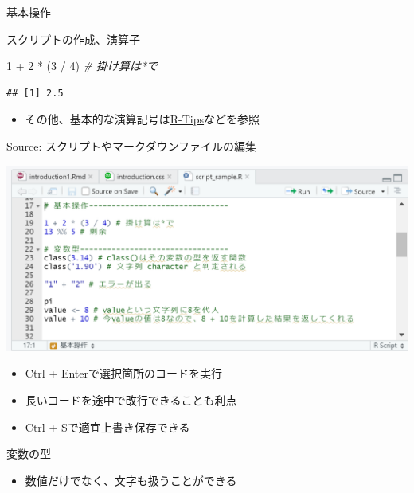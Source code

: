 \documentclass[
  ignorenonframetext,
]{beamer}
\newenvironment{Shaded}{\begin{snugshade}}{\end{snugshade}}
\newcommand{\CommentTok}[1]{\textcolor[rgb]{0.56,0.35,0.01}{\textit{#1}}}
\newcommand{\DecValTok}[1]{\textcolor[rgb]{0.00,0.00,0.81}{#1}}
\newcommand{\NormalTok}[1]{#1}
\newcommand{\SpecialCharTok}[1]{\textcolor[rgb]{0.00,0.00,0.00}{#1}}
\providecommand{\tightlist}{%
  \setlength{\itemsep}{0pt}\setlength{\parskip}{0pt}}
\begin{document}
\begin{frame}[fragile]{基本操作}
\begin{block}{スクリプトの作成、演算子}
\begin{Shaded}
\begin{Highlighting}[]
\DecValTok{1} \SpecialCharTok{+} \DecValTok{2} \SpecialCharTok{*}\NormalTok{ (}\DecValTok{3} \SpecialCharTok{/} \DecValTok{4}\NormalTok{) }\CommentTok{\# 掛け算は*で}
\end{Highlighting}
\end{Shaded}

\begin{verbatim}
## [1] 2.5
\end{verbatim}

\begin{itemize}
\tightlist
\item
  その他、基本的な演算記号は\href{http://cse.naro.affrc.go.jp/takezawa/r-tips/r.html}{R-Tips}などを参照
\end{itemize}
\end{block}

\begin{block}{Source: スクリプトやマークダウンファイルの編集}
\protect\hypertarget{source-ux30b9ux30afux30eaux30d7ux30c8ux3084ux30deux30fcux30afux30c0ux30a6ux30f3ux30d5ux30a1ux30a4ux30ebux306eux7de8ux96c6}{}
\begin{center}\includegraphics[width=0.95\linewidth]{figs/script} \end{center}

\begin{itemize}
\tightlist
\item
  Ctrl + Enterで選択箇所のコードを実行
\item
  長いコードを途中で改行できることも利点
\item
  Ctrl + Sで適宜上書き保存できる
\end{itemize}
\end{block}

\begin{block}{変数の型}
\protect\hypertarget{ux5909ux6570ux306eux578b}{}
\begin{itemize}
\tightlist
\item
  数値だけでなく、文字も扱うことができる


\end{itemize}
\end{block}
\end{frame}
\end{document}
